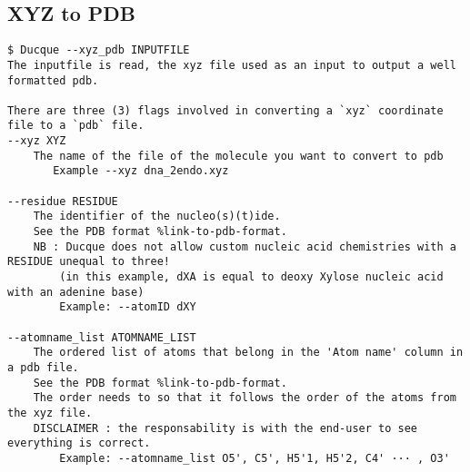 \pagebreak
\subsection{XYZ to PDB}

\small
\begin{verbatim}
$ Ducque --xyz_pdb INPUTFILE
The inputfile is read, the xyz file used as an input to output a well formatted pdb.

There are three (3) flags involved in converting a `xyz` coordinate file to a `pdb` file.
--xyz XYZ
    The name of the file of the molecule you want to convert to pdb
       Example --xyz dna_2endo.xyz

--residue RESIDUE
    The identifier of the nucleo(s)(t)ide.
    See the PDB format %link-to-pdb-format.
    NB : Ducque does not allow custom nucleic acid chemistries with a RESIDUE unequal to three!
        (in this example, dXA is equal to deoxy Xylose nucleic acid with an adenine base)
        Example: --atomID dXY

--atomname_list ATOMNAME_LIST
    The ordered list of atoms that belong in the 'Atom name' column in a pdb file.
    See the PDB format %link-to-pdb-format.
    The order needs to so that it follows the order of the atoms from the xyz file. 
    DISCLAIMER : the responsability is with the end-user to see everything is correct.
        Example: --atomname_list O5', C5', H5'1, H5'2, C4' ··· , O3' 
\end{verbatim}
\normalsize
